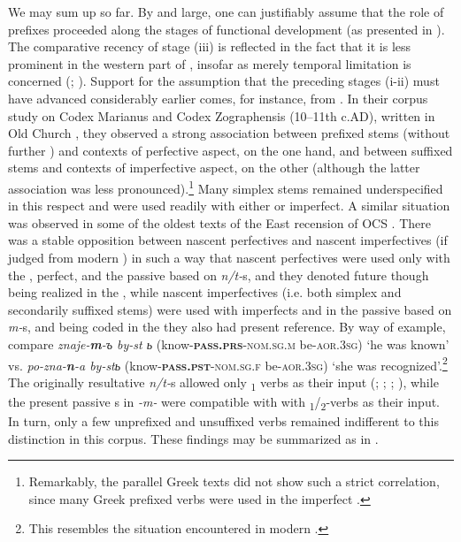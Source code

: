 \documentclass[output=paper]{langsci/langscibook}
\begin{document}
We may sum up so far. By and large, one can justifiably assume that the role of prefixes proceeded along the stages of functional development (as presented in ).
The comparative recency of stage (iii) is reflected in the fact that it is less prominent in the western part of , insofar as merely temporal limitation is concerned (\citealt[Chapter 7]{Dickey2000}; \citeyear{Dickey2011}). Support for the assumption that the preceding stages (i-ii) must have advanced considerably earlier comes, for instance, from \citet[202--207]{Eckhoff2015}. In their corpus study on Codex Marianus and Codex Zographensis (10–11th c.AD), written in Old Church , they observed a strong association between prefixed stems (without further ) and contexts of perfective aspect, on the one hand, and between suffixed stems and contexts of imperfective aspect, on the other (although the latter association was less pronounced).\footnote{Remarkably, the parallel Greek texts did not show such a strict correlation, since many Greek prefixed verbs were used in the imperfect \citep[202]{Eckhoff2015}.} Many simplex stems remained underspecified in this respect and were used readily with either  or imperfect. A similar situation was observed in some of the oldest texts of the East  recension of OCS
\citep{Seržant2009}. There was a stable opposition between nascent perfectives and nascent imperfectives (if judged from modern ) in such a way that nascent perfectives were used only with the , perfect, and the passive based on \textit{n/t-}s, and they denoted future though being realized in the , while nascent imperfectives (i.e. {both simplex and secondarily suffixed stems)} were used with imperfects and in the passive based on \textit{m-}s, and being coded in the  they also had present  reference. By way of example, compare 
\textit{znaje-\textbf{m}-ъ by-st ь} 
(know-\textbf{\textsc{pass.prs}}\textsc{-nom.sg.m} be-\textsc{aor.3sg}) 
‘he was known’ 
vs. 
\textit{po-zna-\textbf{n}-a by-stь}
(know-\textbf{\textsc{pass.pst}}\textsc{-nom.sg.f} be-\textsc{aor.3sg}) 
‘she was recognized’.\footnote{This resembles the situation encountered in modern  \citep[321–322]{Seržant2009}.} The originally resultative \textit{n/t-}s allowed only \textsubscript{1} verbs as their input (\citealt{Brugmann1895}; \citealt[101f{.}]{Havránek1937}{;} \citealt[41]{Haig2008}; \citealt[359--361]{Seržant2012}), while the present passive s in \textit{-m-} were compatible with  with \textsubscript{1}/\textsubscript{2}-verbs as their input. In turn, only a few unprefixed and unsuffixed verbs remained indifferent to this distinction in this corpus. These findings may be summarized as in .
\end{document}
